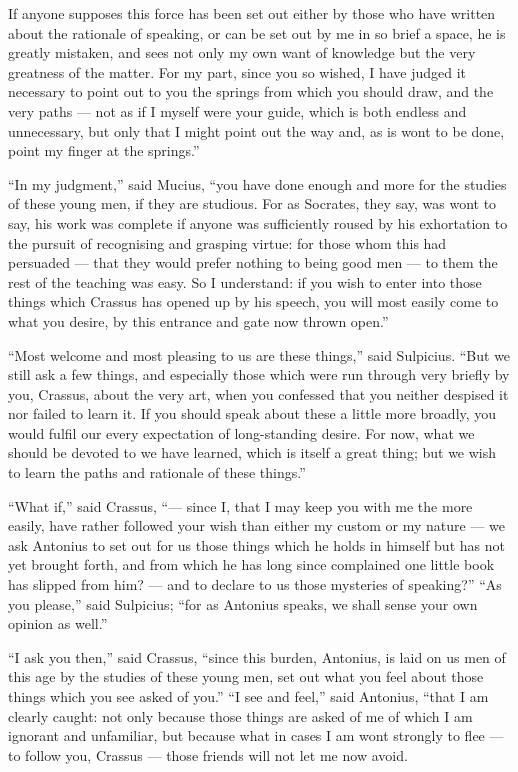  If anyone supposes this force has been set out either by those who have written about the rationale of speaking, or can be set out by me in so brief a space, he is greatly mistaken, and sees not only my own want of knowledge but the very greatness of the matter. For my part, since you so wished, I have judged it necessary to point out to you the springs from which you should draw, and the very paths — not as if I myself were your guide, which is both endless and unnecessary, but only that I might point out the way and, as is wont to be done, point my finger at the springs.''

 ``In my judgment,'' said Mucius, ``you have done enough and more for the studies of these young men, if they are studious. For as Socrates, they say, was wont to say, his work was complete if anyone was sufficiently roused by his exhortation to the pursuit of recognising and grasping virtue: for those whom this had persuaded — that they would prefer nothing to being good men — to them the rest of the teaching was easy. So I understand: if you wish to enter into those things which Crassus has opened up by his speech, you will most easily come to what you desire, by this entrance and gate now thrown open.''

 ``Most welcome and most pleasing to us are these things,'' said Sulpicius. ``But we still ask a few things, and especially those which were run through very briefly by you, Crassus, about the very art, when you confessed that you neither despised it nor failed to learn it. If you should speak about these a little more broadly, you would fulfil our every expectation of long-standing desire. For now, what we should be devoted to we have learned, which is itself a great thing; but we wish to learn the paths and rationale of these things.''

 ``What if,'' said Crassus, ``— since I, that I may keep you with me the more easily, have rather followed your wish than either my custom or my nature — we ask Antonius to set out for us those things which he holds in himself but has not yet brought forth, and from which he has long since complained one little book has slipped from him? — and to declare to us those mysteries of speaking?'' ``As you please,'' said Sulpicius; ``for as Antonius speaks, we shall sense your own opinion as well.''

 ``I ask you then,'' said Crassus, ``since this burden, Antonius, is laid on us men of this age by the studies of these young men, set out what you feel about those things which you see asked of you.'' ``I see and feel,'' said Antonius, ``that I am clearly caught: not only because those things are asked of me of which I am ignorant and unfamiliar, but because what in cases I am wont strongly to flee — to follow you, Crassus — those friends will not let me now avoid.

